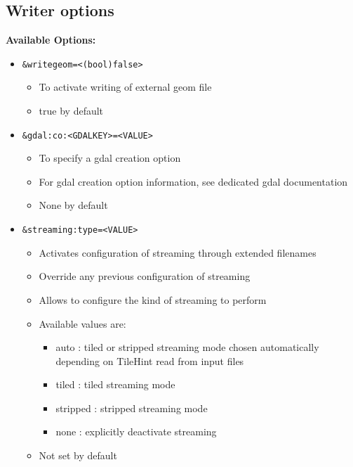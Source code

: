 \subsection{Writer options}

\textbf{Available Options:}

\begin{itemize}

\item \begin{verbatim}&writegeom=<(bool)false>\end{verbatim}
  \begin{itemize}
  \item To activate writing of external geom file
  \item true by default
  \end{itemize}  
\item \begin{verbatim}&gdal:co:<GDALKEY>=<VALUE>\end{verbatim}
  \begin{itemize}
  \item To specify a gdal creation option
  \item For gdal creation option information, see dedicated gdal documentation
  \item None by default 
  \end{itemize}
\item \begin{verbatim}&streaming:type=<VALUE>\end{verbatim}
  \begin{itemize}
  \item Activates configuration of streaming through extended filenames
  \item Override any previous configuration of streaming
  \item Allows to configure the kind of streaming to perform
  \item Available values are:
    \begin{itemize}
    \item auto : tiled or stripped streaming mode chosen automatically depending on TileHint read from input files
    \item tiled : tiled streaming mode
    \item stripped : stripped streaming mode
    \item none : explicitly deactivate streaming 
    \end{itemize}
  \item Not set by default 

\end{itemize}
\end{itemize}
